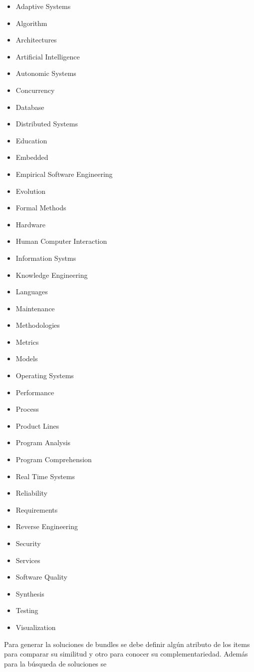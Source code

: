 \begin{itemize}
 \item Adaptive Systems
 \item Algorithm
 \item Architectures
 \item Artificial Intelligence
 \item Autonomic Systems
 \item Concurrency
 \item Database
 \item Distributed Systems
 \item Education
 \item Embedded
 \item Empirical Software Engineering
 \item Evolution
 \item Formal Methods
 \item Hardware
 \item Human Computer Interaction
 \item Information Systms
 \item Knowledge Engineering
 \item Languages
 \item Maintenance
 \item Methodologies
 \item Metrics
 \item Models
 \item Operating Systems
 \item Performance
 \item Process
 \item Product Lines
 \item Program Analysis
 \item Program Comprehension
 \item Real Time Systems
 \item Reliability
 \item Requirements
 \item Reverse Engineering
 \item Security
 \item Services
 \item Software Quality
 \item Synthesis
 \item Testing
 \item Visualization
\end{itemize}
Para generar la soluciones de bundles se debe definir algún atributo de los items para comparar su 
similitud y otro para conocer su complementariedad. Además para la búsqueda de soluciones se 
